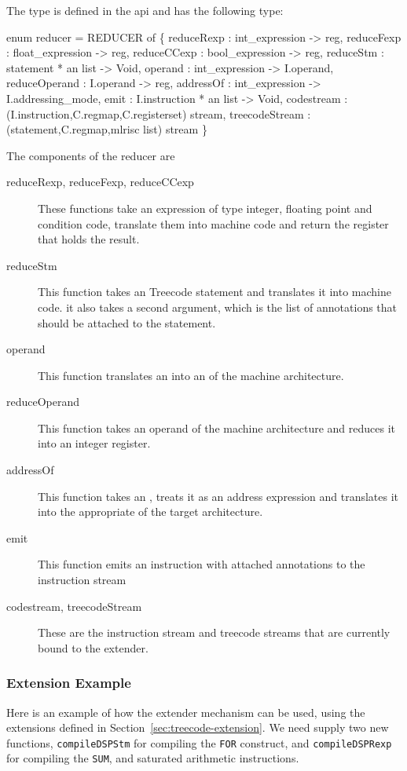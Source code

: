 The  type is defined
in the api  and has the
following type:
\begin{SML}
  enum reducer =
    REDUCER of
    \{ reduceRexp    : int_expression -> reg,
      reduceFexp    : float_expression -> reg,
      reduceCCexp   : bool_expression -> reg,
      reduceStm     : statement * an list -> Void,
      operand       : int_expression -> I.operand,
      reduceOperand : I.operand -> reg,
      addressOf     : int_expression -> I.addressing_mode,
      emit          : I.instruction * an list -> Void,
      codestream   : (I.instruction,C.regmap,C.registerset) stream,
      treecodeStream  : (statement,C.regmap,mlrisc list) stream
    \}
\end{SML}

The components of the reducer are
\begin{description}
  \item[reduceRexp, reduceFexp, reduceCCexp] These functions 
take an expression of type integer, floating point and condition code, 
translate them into machine code and return the 
register that holds the result. 
  \item[reduceStm] This function takes an Treecode statement and translates
it into machine code.  it also takes a second argument, which is the
list of annotations that should be attached to the statement.
  \item[operand] This function translates an  into an
  of the machine architecture.
  \item[reduceOperand] This function takes an operand of the machine
architecture and reduces it into an integer register.
  \item[addressOf] This function takes an , treats
it as an address expression and translates it into the appropriate
 of the target architecture.
  \item[emit]  This function emits an instruction with attached annotations
to the instruction stream
  \item[codestream, treecodeStream]  These are the instruction stream
and treecode streams that are currently bound to the extender.
\end{description}

\subsubsection{Extension Example}
Here is an example of how the extender mechanism can be used,
using the  extensions defined in
Section~\ref{sec:treecode-extension}.   We need supply two
new functions, \verb|compileDSPStm| for compiling the \verb|FOR|
construct, and \verb|compileDSPRexp| for compiling the \verb|SUM|,
and saturated arithmetic instructions.

